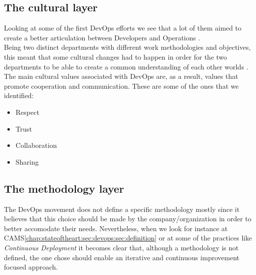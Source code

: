      \subsection{The cultural layer} \label{chap:stateoftheart:sec:devops:sec:culture}
      Looking at some of the first DevOps efforts we see that a lot of them aimed to create a better articulation between Developers and Operations \cite{Debois2008} \cite{Allspaw}.\\
      Being two distinct departments with different work methodologies and objectives, this meant that some cultural changes had to happen in order for the two departments to be able to create a common understanding of each other worlds \cite{Allspaw}.\\
      The main cultural values associated with DevOps are, as a result, values that promote cooperation and communication. These are some of the ones that we identified:
      \begin{itemize}
          \item Respect \cite{Davis2015} \cite{Allspaw}
          \item Trust \cite{Huttermann2012}
          \item Collaboration \cite{Davis2015}
          \item Sharing \cite{Willis2010}
      \end{itemize}

      \subsection{The methodology layer} \label{chap:stateoftheart:sec:devops:sec:methodology}
      The DevOps movement does not define a specific methodology mostly since it believes that this choice should be made by the company/organization in order to better accomodate their needs. Nevertheless, when we look for instance at CAMS\ref{chap:stateoftheart:sec:devops:sec:definition} or at some of the practices like \textit{Continuous Deployment} it becomes clear that, although a methodology is not defined, the one chose should enable an iterative and continuous improvement focused approach.

